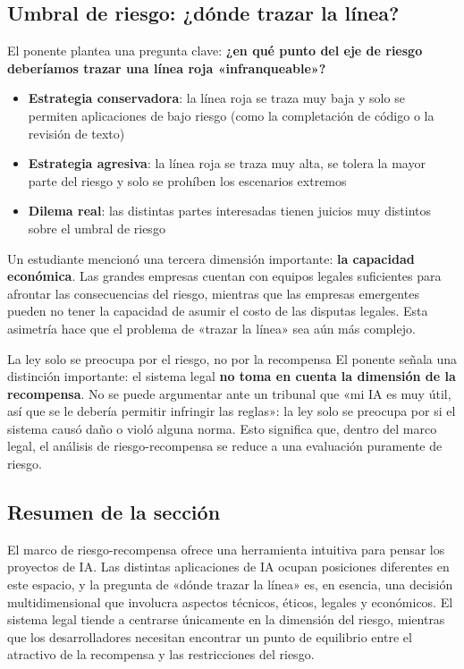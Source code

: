 \subsection{Umbral de riesgo: ¿dónde trazar la línea?}

El ponente plantea una pregunta clave: \textbf{¿en qué punto del eje de riesgo deberíamos trazar una línea roja «infranqueable»?}

\begin{itemize}
    \item \textbf{Estrategia conservadora}: la línea roja se traza muy baja y solo se permiten aplicaciones de bajo riesgo (como la completación de código o la revisión de texto)
    \item \textbf{Estrategia agresiva}: la línea roja se traza muy alta, se tolera la mayor parte del riesgo y solo se prohíben los escenarios extremos
    \item \textbf{Dilema real}: las distintas partes interesadas tienen juicios muy distintos sobre el umbral de riesgo
\end{itemize}

Un estudiante mencionó una tercera dimensión importante: \textbf{la capacidad económica}. Las grandes empresas cuentan con equipos legales suficientes para afrontar las consecuencias del riesgo, mientras que las empresas emergentes pueden no tener la capacidad de asumir el costo de las disputas legales. Esta asimetría hace que el problema de «trazar la línea» sea aún más complejo.

\begin{knowledgebox}{La ley solo se preocupa por el riesgo, no por la recompensa}
El ponente señala una distinción importante: el sistema legal \textbf{no toma en cuenta la dimensión de la recompensa}. No se puede argumentar ante un tribunal que «mi IA es muy útil, así que se le debería permitir infringir las reglas»: la ley solo se preocupa por si el sistema causó daño o violó alguna norma. Esto significa que, dentro del marco legal, el análisis de riesgo-recompensa se reduce a una evaluación puramente de riesgo.
\end{knowledgebox}

\subsection{Resumen de la sección}

El marco de riesgo-recompensa ofrece una herramienta intuitiva para pensar los proyectos de IA. Las distintas aplicaciones de IA ocupan posiciones diferentes en este espacio, y la pregunta de «dónde trazar la línea» es, en esencia, una decisión multidimensional que involucra aspectos técnicos, éticos, legales y económicos. El sistema legal tiende a centrarse únicamente en la dimensión del riesgo, mientras que los desarrolladores necesitan encontrar un punto de equilibrio entre el atractivo de la recompensa y las restricciones del riesgo.

